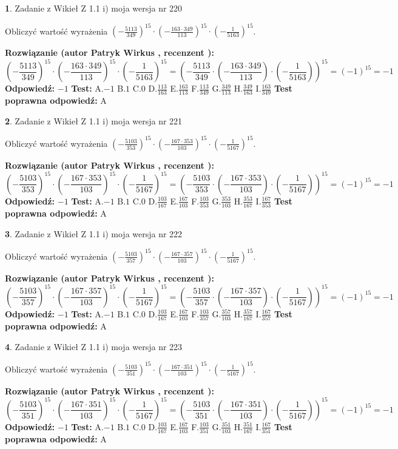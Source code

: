 \documentclass[12pt, a4paper]{article}
\theoremstyle{definition} %
\newtheorem{zad}{}
\newcommand{\zadStart}[1]{\begin{zad}#1\newline}
\newcommand{\zadStop}{\end{zad}}
\newcommand{\rozwStart}[2]{\noindent \textbf{Rozwiązanie (autor #1 , recenzent #2): }\newline}
\newcommand{\rozwStop}{\newline}
\newcommand{\odpStart}{\noindent \textbf{Odpowiedź:}\newline}
\newcommand{\odpStop}{\newline}
\newcommand{\testStart}{\noindent \textbf{Test:}\newline}
\newcommand{\testStop}{\newline}
\newcommand{\kluczStart}{\noindent \textbf{Test poprawna odpowiedź:}\newline}
\newcommand{\kluczStop}{\newline}
\begin{document}
\zadStart{Zadanie z Wikieł Z 1.1 i) moja wersja nr 220}

Obliczyć wartość wyrażenia $(-\frac{5113}{349})^{15} \cdot (-\frac{163 \cdot 349}{113})^{15} \cdot (-\frac{1}{5163})^{15}$.
\zadStop
\rozwStart{Patryk Wirkus}{}
$$(-\frac{5113}{349})^{15} \cdot (-\frac{163 \cdot 349}{113})^{15} \cdot (-\frac{1}{5163})^{15} = (-\frac{5113}{349} \cdot (-\frac{163 \cdot 349}{113}) \cdot (-\frac{1}{5163}))^{15} = (-1)^{15} = -1$$
\rozwStop
\odpStart
$-1$
\odpStop
\testStart
A.$-1$ B.$1$ C.$0$ D.$\frac{113}{163}$ E.$\frac{163}{113}$
F.$\frac{113}{349}$ G.$\frac{349}{113}$
H.$\frac{349}{163}$
I.$\frac{163}{349}$
\testStop
\kluczStart
A
\kluczStop



\zadStart{Zadanie z Wikieł Z 1.1 i) moja wersja nr 221}

Obliczyć wartość wyrażenia $(-\frac{5103}{353})^{15} \cdot (-\frac{167 \cdot 353}{103})^{15} \cdot (-\frac{1}{5167})^{15}$.
\zadStop
\rozwStart{Patryk Wirkus}{}
$$(-\frac{5103}{353})^{15} \cdot (-\frac{167 \cdot 353}{103})^{15} \cdot (-\frac{1}{5167})^{15} = (-\frac{5103}{353} \cdot (-\frac{167 \cdot 353}{103}) \cdot (-\frac{1}{5167}))^{15} = (-1)^{15} = -1$$
\rozwStop
\odpStart
$-1$
\odpStop
\testStart
A.$-1$ B.$1$ C.$0$ D.$\frac{103}{167}$ E.$\frac{167}{103}$
F.$\frac{103}{353}$ G.$\frac{353}{103}$
H.$\frac{353}{167}$
I.$\frac{167}{353}$
\testStop
\kluczStart
A
\kluczStop



\zadStart{Zadanie z Wikieł Z 1.1 i) moja wersja nr 222}

Obliczyć wartość wyrażenia $(-\frac{5103}{357})^{15} \cdot (-\frac{167 \cdot 357}{103})^{15} \cdot (-\frac{1}{5167})^{15}$.
\zadStop
\rozwStart{Patryk Wirkus}{}
$$(-\frac{5103}{357})^{15} \cdot (-\frac{167 \cdot 357}{103})^{15} \cdot (-\frac{1}{5167})^{15} = (-\frac{5103}{357} \cdot (-\frac{167 \cdot 357}{103}) \cdot (-\frac{1}{5167}))^{15} = (-1)^{15} = -1$$
\rozwStop
\odpStart
$-1$
\odpStop
\testStart
A.$-1$ B.$1$ C.$0$ D.$\frac{103}{167}$ E.$\frac{167}{103}$
F.$\frac{103}{357}$ G.$\frac{357}{103}$
H.$\frac{357}{167}$
I.$\frac{167}{357}$
\testStop
\kluczStart
A
\kluczStop



\zadStart{Zadanie z Wikieł Z 1.1 i) moja wersja nr 223}

Obliczyć wartość wyrażenia $(-\frac{5103}{351})^{15} \cdot (-\frac{167 \cdot 351}{103})^{15} \cdot (-\frac{1}{5167})^{15}$.
\zadStop
\rozwStart{Patryk Wirkus}{}
$$(-\frac{5103}{351})^{15} \cdot (-\frac{167 \cdot 351}{103})^{15} \cdot (-\frac{1}{5167})^{15} = (-\frac{5103}{351} \cdot (-\frac{167 \cdot 351}{103}) \cdot (-\frac{1}{5167}))^{15} = (-1)^{15} = -1$$
\rozwStop
\odpStart
$-1$
\odpStop
\testStart
A.$-1$ B.$1$ C.$0$ D.$\frac{103}{167}$ E.$\frac{167}{103}$
F.$\frac{103}{351}$ G.$\frac{351}{103}$
H.$\frac{351}{167}$
I.$\frac{167}{351}$
\testStop
\kluczStart
A
\kluczStop
\end{document}
